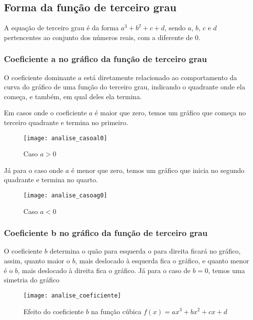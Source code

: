 \documentclass[../resumo.tex]{subfiles}
\begin{document}
	\subsection{Forma da função de terceiro grau}

	A equação de terceiro grau é da forma $a^3 + b^2 + c + d$, sendo $a$, $b$, $c$ e $d$ pertencentes ao 
	conjunto dos números reais, com a diferente de $0$.

	\subsubsection{Coeficiente a no gráfico da função de terceiro grau}

	O coeficiente dominante $a$ está diretamente relacionado ao comportamento da curva do 
	gráfico de uma função do terceiro grau, indicando o quadrante onde ela começa, e também, em
	qual deles ela termina.

	Em casos onde o coeficiente $a$ é maior que zero, temos um gráfico que começa no terceiro
	quadrante e termina no primeiro.

	\begin{figure}[H]
		\centering
		\texttt{[image: analise\_casoal0]}
		\caption{Caso $a > 0$}
		\label{fig:analise_casomenor0}
	\end{figure}

	Já para o caso onde $a$ é menor que zero, temos um gráfico que inicia no segundo quadrante 
	e termina no quarto.

	\begin{figure}[H]
		\centering
		\texttt{[image: analise\_casoag0]}
		\caption{Caso $a < 0$}
		\label{fig:analise_casomaior0}
	\end{figure}

	\subsubsection{Coeficiente b no gráfico da função de terceiro grau}

	O coeficiente $b$ determina o quão para esquerda o para direita ficará no gráfico, assim,
	quanto maior o $b$, mais deslocado à esquerda fica o gráfico, e quanto menor é o $b$, mais deslocado
	à direita fica o gráfico. Já para o caso de $b = 0$, temos uma simetria do gráfico

	\begin{figure}[H]
		\centering
		\texttt{[image: analise\_coeficiente]}
		\caption{Efeito do coeficiente $b$ na função cúbica $f(x) = ax^3 + bx^2 + cx + d$}
		\label{fig:analise_coeficiente}
	\end{figure}
\end{document}
